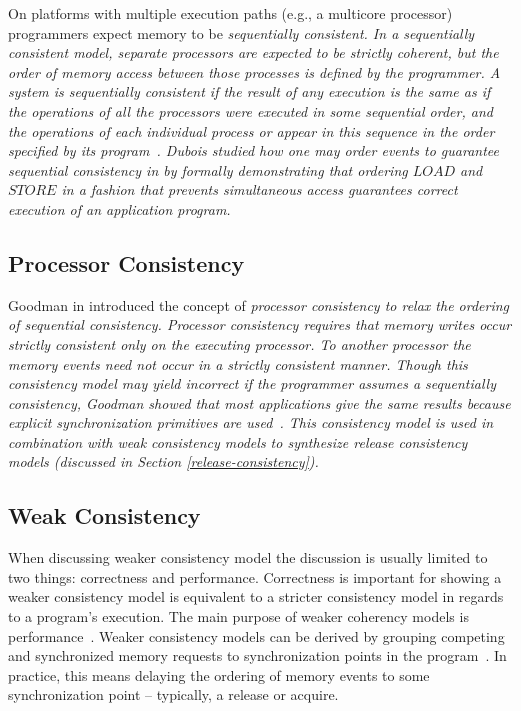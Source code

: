 \documentclass[10pt,conference]{IEEEtran}
\begin{document}
On platforms with multiple execution paths (e.g., a multicore processor) programmers expect memory to be \em sequentially consistent\em.  In a \em sequentially consistent \em model, separate processors are expected to be \em strictly coherent\em, but the order of memory access between those processes is defined by the programmer.  A system is sequentially consistent if the result of any execution is the same as if the operations of all the processors were executed in some sequential order, and the operations of each individual process or appear in this sequence in the order specified by its program~\cite{Lamport:1979:MMC:1311099.1311750}.  Dubois studied how one may order events to guarantee sequential consistency in \cite{Scheurich:1987:CMO:30350.30377} by formally demonstrating that ordering $LOAD$ and $STORE$ in a fashion that prevents simultaneous access guarantees correct execution of an application program. 

\subsection{Processor Consistency}

Goodman in \cite{Goodman:1989:53705} introduced the concept of \em processor consistency \em to relax the ordering of \em sequential consistency\em.  Processor consistency requires that memory writes occur strictly consistent only on the executing processor.  To another processor the memory events need not occur in a strictly consistent manner.  Though this consistency model may yield incorrect if the programmer assumes a sequentially consistency, Goodman showed that most applications give the same results because explicit synchronization primitives are used~\cite{Goodman:1989:53705}.  This consistency model is used in combination with weak consistency models to synthesize release consistency models (discussed in Section \ref{release-consistency}).

\subsection{Weak Consistency}
\label{weak-consistency}

When discussing weaker consistency model the discussion is usually limited to two things: correctness and performance.  Correctness is important for showing a weaker consistency model is equivalent to a stricter consistency model in regards to a program's execution.  The main purpose of weaker coherency models is performance~\cite{Gharachorloo:1990:MCE:325164.325102}.  Weaker consistency models can be derived by grouping competing and synchronized memory requests to synchronization points in the program~\cite{Gharachorloo:1990:MCE:325164.325102}.  In practice, this means delaying the ordering of memory events to some synchronization point -- typically, a release or acquire.
\end{document}
